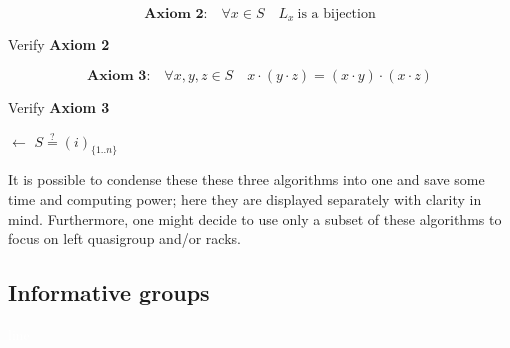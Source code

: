 \documentclass{mcom-l}
\begin{document}
\[\textbf{Axiom 2:}\quad\forall x \in S \quad L_x~\text{is a bijection}\]
\begin{algorithm}[H]
\caption{Verify \textbf{Axiom 2}}\label{alg:axiom2}
\DontPrintSemicolon
{}
\BlankLine
\BlankLine
{}
\end{algorithm}
\[\textbf{Axiom 3:}\quad \forall x,y,z \in S \quad x \cdot (y \cdot z) = (x \cdot y) \cdot (x \cdot z)\]
\begin{algorithm}[H]
\DontPrintSemicolon
\caption{Verify \textbf{Axiom 3}}\label{alg:axiom3}
\BlankLine
\BlankLine
\Exp $\leftarrow$ $S \overset{?}{=} (i)_{\{1..n\}}$\;
\end{algorithm}
\noindent It is possible to condense these these three algorithms into one and save some time and computing power; here they are displayed separately with clarity in mind. Furthermore, one might decide to use only a subset of these algorithms to focus on left quasigroup and/or racks.
\subsection{Informative groups}\textcolor{white}{line}\newline
\end{document}
